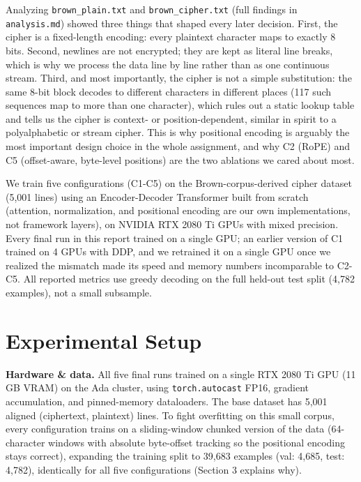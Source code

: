 \documentclass[12pt,a4paper]{article}
\begin{document}
Analyzing \texttt{brown\_plain.txt} and \texttt{brown\_cipher.txt} (full findings in \texttt{analysis.md}) showed three things that shaped every later decision. First, the cipher is a fixed-length encoding: every plaintext character maps to exactly 8 bits. Second, newlines are not encrypted; they are kept as literal line breaks, which is why we process the data line by line rather than as one continuous stream. Third, and most importantly, the cipher is not a simple substitution: the same 8-bit block decodes to different characters in different places (117 such sequences map to more than one character), which rules out a static lookup table and tells us the cipher is context- or position-dependent, similar in spirit to a polyalphabetic or stream cipher. This is why positional encoding is arguably the most important design choice in the whole assignment, and why C2 (RoPE) and C5 (offset-aware, byte-level positions) are the two ablations we cared about most.

We train five configurations (C1-C5) on the Brown-corpus-derived cipher dataset (5,001 lines) using an Encoder-Decoder Transformer built from scratch (attention, normalization, and positional encoding are our own implementations, not framework layers), on NVIDIA RTX 2080 Ti GPUs with mixed precision. Every final run in this report trained on a single GPU; an earlier version of C1 trained on 4 GPUs with DDP, and we retrained it on a single GPU once we realized the mismatch made its speed and memory numbers incomparable to C2-C5. All reported metrics use greedy decoding on the full held-out test split (4,782 examples), not a small subsample.

\section{Experimental Setup}

\textbf{Hardware \& data.} All five final runs trained on a single RTX 2080 Ti GPU (11 GB VRAM) on the Ada cluster, using \texttt{torch.autocast} FP16, gradient accumulation, and pinned-memory dataloaders. The base dataset has 5,001 aligned (ciphertext, plaintext) lines. To fight overfitting on this small corpus, every configuration trains on a sliding-window chunked version of the data (64-character windows with absolute byte-offset tracking so the positional encoding stays correct), expanding the training split to 39,683 examples (val: 4,685, test: 4,782), identically for all five configurations (Section 3 explains why).
\end{document}
